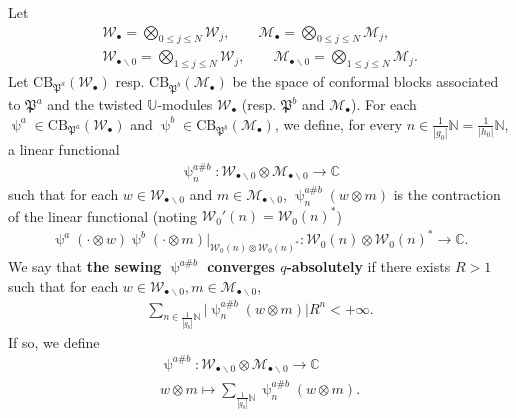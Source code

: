 \documentclass[11pt,b5paper,notitlepage]{article}
\theoremstyle{definition}
\theoremstyle{plain}
\newcommand{\fk}{\mathfrak}
\newcommand{\mc}{\mathcal}
\newcommand{\blt}{\bullet}
\newcommand{\Ubb}{\mathbb U}
\newcommand{\Cbb}{\mathbb C}
\newcommand{\Nbb}{\mathbb N}
\newcommand{\CB}{\mathrm{CB}}
\numberwithin{equation}{subsection}
\begin{document}
Let 
\begin{gather*}
\mc W_\blt=\bigotimes_{0\leq j\leq N}\mc W_j,\qquad 	\mc M_\blt=\bigotimes_{0\leq j\leq N}\mc M_j,\\
\mc W_{\blt\backslash 0}=\bigotimes_{1\leq j\leq N}\mc W_j,\qquad 	\mc M_{\blt\backslash 0}=\bigotimes_{1\leq j\leq N}\mc M_j.
\end{gather*}
Let $\CB_{\fk P^a}(\mc W_\blt)$ resp. $\CB_{\fk P^b}(\mc M_\blt)$ be the space of conformal blocks associated to $\fk P^a$ and the twisted $\Ubb$-modules $\mc W_\blt$ (resp. $\fk P^b$ and $\mc M_\blt$).  For each $\uppsi^a\in\CB_{\fk P^a}(\mc W_\blt)$ and $\uppsi^b\in\CB_{\fk P^b}(\mc M_\blt)$, we define, for every $n\in \frac 1{|g_0|}\Nbb=\frac{1}{|h_0|}\Nbb$, a linear functional
\begin{align*}
\uppsi^{a\#b}_n:	\mc W_{\blt\backslash 0}\otimes\mc M_{\blt\backslash 0}\rightarrow \Cbb
\end{align*}
such that for each $w\in \mc W_{\blt\backslash 0}$ and $m\in \mc M_{\blt\backslash 0}$, $\uppsi^{a\#b}_n(w\otimes m)$ is the contraction of the linear functional (noting $\mc W_0'(n)=\mc W_0(n)^*$)
\begin{align*}
\uppsi^a(\cdot \otimes w)\uppsi^b(\cdot\otimes m)\Big|_{\mc W_0(n)\otimes\mc W_0(n)^*}:	\mc W_0(n)\otimes\mc W_0(n)^*\rightarrow\Cbb.
\end{align*}
We say that  \textbf{the sewing $\uppsi^{a\#b}$ converges $q$-absolutely} if there exists $R>1$ such that for each $w\in\mc W_{\blt\backslash 0},m\in\mc M_{\blt\backslash 0}$, 
\begin{align*}
\sum_{n\in\frac 1{|g_0|}\Nbb}\big|\uppsi_n^{a\#b}(w\otimes m)\big|R^n<+\infty.
\end{align*} 
If so, we define
\begin{gather*}
\uppsi^{a\#b}:	\mc W_{\blt\backslash 0}\otimes\mc M_{\blt\backslash 0}\rightarrow \Cbb\\
w\otimes m\mapsto \sum_{\frac 1{|g_0|}\Nbb}\uppsi^{a\#b}_n(w\otimes m).
\end{gather*}
\end{document}
